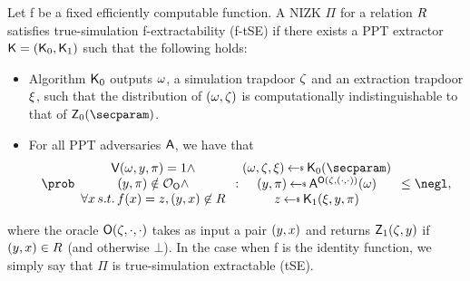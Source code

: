 \begin{definition}\label{def:nizk_ks}
    Let f be a fixed efficiently computable function. A NIZK $\Pi$ for a relation $R$ satisfies true-simulation f-extractability (f-tSE) if there exists a PPT extractor $\mathsf{K} = (\mathsf{K}_0,\mathsf{K}_1)$ such that the following holds:
    \begin{itemize}
        \item
              Algorithm $\mathsf{K}_0$ outputs $\omega$, a simulation trapdoor $\zeta$ and an extraction trapdoor $\xi$, such that the distribution of $(\omega,\zeta)$ is computationally indistinguishable to that of $\nizksim_0(\secparam)$.
        \item For all PPT adversaries $\mathsf{A}$, we have that
              \[
                  \Prob{
                      \begin{array}{c}
                          \verifier(\crs,\stm,\pi)=1 \wedge                      \\
                          (\stm,\pi)\notin\mathcal{O}_{\alg{O}} \wedge           \\
                          \forall\wit\, s.t.\, f(\wit)=z, (\stm,\wit)\not\in\Rel \\
                      \end{array}:
                      \begin{array}{@{}c}
                          (\crs,\tpsim,\tpext)\getsr\nizkext_0(\secparam)                \\
                          (\stm,\pi)\getsr\adv^{\advSOracle(\tpsim,(\cdot,\cdot))}(\crs) \\
                          z\getsr\nizkext_1(\tpext,\stm,\pi)
                      \end{array}} \le \negl,
              \]
    \end{itemize}
    where the oracle $\mathsf{O}(\zeta,\cdot,\cdot)$ takes as input a pair $(y,x)$ and returns $\mathsf{Z}_1(\zeta,y)$ if $(y,x)\in R$ (and otherwise  $\bot$).
    \newline
    In the case when f is the identity function, we simply say that $\Pi$ is true-simulation extractable (tSE).

\end{definition}